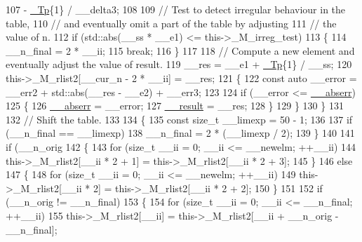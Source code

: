 \begin{DoxyCode}
107                           - \hyperlink{namespace____gnu__cxx_a3b19a9c800ca194374ef9172290f7d79}{\_Tp}\{1\} / \_\_delta3;
108 
109           \textcolor{comment}{// Test to detect irregular behaviour in the table,}
110           \textcolor{comment}{// and eventually omit a part of the table by adjusting}
111           \textcolor{comment}{// the value of n.}
112           \textcolor{keywordflow}{if} (std::abs(\_\_ss * \_\_e1) <= this->\_M\_irreg\_test)
113             \{
114               \_\_n\_final = 2 * \_\_ii;
115               \textcolor{keywordflow}{break};
116             \}
117 
118           \textcolor{comment}{// Compute a new element and eventually adjust the value of result.}
119           \_\_res = \_\_e1 + \hyperlink{namespace____gnu__cxx_a3b19a9c800ca194374ef9172290f7d79}{\_Tp}\{1\} / \_\_ss;
120           this->\_M\_rlist2[\_\_cur\_n - 2 * \_\_ii] = \_\_res;
121           \{
122             \textcolor{keyword}{const} \textcolor{keyword}{auto} \_\_error = \_\_err2 + std::abs(\_\_res - \_\_e2) + \_\_err3;
123 
124             \textcolor{keywordflow}{if} (\_\_error <= \hyperlink{namespace____gnu__cxx_a72f736cff127f1574e91a301de9e074b}{\_\_abserr})
125               \{
126                 \hyperlink{namespace____gnu__cxx_a72f736cff127f1574e91a301de9e074b}{\_\_abserr} = \_\_error;
127                 \hyperlink{namespace____gnu__cxx_a500ea9f53aeaecd8c2ae657503450578}{\_\_result} = \_\_res;
128               \}
129           \}
130         \}
131 
132       \textcolor{comment}{// Shift the table.}
133 
134       \{
135         \textcolor{keyword}{const} \textcolor{keywordtype}{size\_t} \_\_limexp = 50 - 1;
136 
137         \textcolor{keywordflow}{if} (\_\_n\_final == \_\_limexp)
138           \_\_n\_final = 2 * (\_\_limexp / 2);
139       \}
140 
141       \textcolor{keywordflow}{if} (\_\_n\_orig %
142         \{
143           \textcolor{keywordflow}{for} (\textcolor{keywordtype}{size\_t} \_\_ii = 0; \_\_ii <= \_\_newelm; ++\_\_ii)
144             this->\_M\_rlist2[\_\_ii * 2 + 1] = this->\_M\_rlist2[\_\_ii * 2 + 3];
145         \}
146       \textcolor{keywordflow}{else}
147         \{
148           \textcolor{keywordflow}{for} (\textcolor{keywordtype}{size\_t} \_\_ii = 0; \_\_ii <= \_\_newelm; ++\_\_ii)
149             this->\_M\_rlist2[\_\_ii * 2] = this->\_M\_rlist2[\_\_ii * 2 + 2];
150         \}
151 
152       \textcolor{keywordflow}{if} (\_\_n\_orig != \_\_n\_final)
153         \{
154           \textcolor{keywordflow}{for} (\textcolor{keywordtype}{size\_t} \_\_ii = 0; \_\_ii <= \_\_n\_final; ++\_\_ii)
155             this->\_M\_rlist2[\_\_ii] = this->\_M\_rlist2[\_\_ii + \_\_n\_orig - \_\_n\_final];

\end{DoxyCode}
